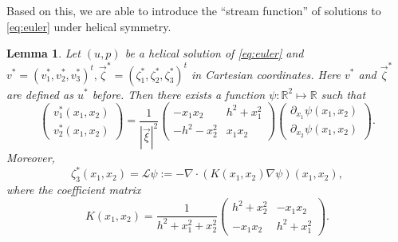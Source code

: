 \documentclass[12pt,reqno]{amsart}
\numberwithin{equation}{section}
\newtheorem{lemma}[theorem]{Lemma}
\theoremstyle{definition}
\theoremstyle{remark}
\newcommand{\Om}{\Omega}
\begin{document}
Based on this, we are able to  introduce the  ``stream function'' of   solutions to \eqref{eq:euler} under helical symmetry. %
\begin{lemma}\label{lm2-4}
Let $  (u, p)  $ be a helical solution of \eqref{eq:euler} and $ v^*=(v^*_1,v^*_2,v^*_3)^t, \vec{\zeta}^*=(\zeta_1^*,\zeta_2^*,\zeta_3^*)^t $ in Cartesian coordinates. Here $v^*$ and $\vec{\zeta}^*$ are defined as $u^*$ before. Then there exists a function  $\psi: \mathbb R^2\mapsto \mathbb R$ such that 
	   \begin{equation}\label{2-5}
	   	 \begin{pmatrix}
	   	 	v_1^*(x_1,x_2) \\
	   	 	v_2^*(x_1,x_2)
	   	 \end{pmatrix}=\frac{1}{|\vec{\xi}|^2}\begin{pmatrix}
	   	- x_1x_2 &   h^2+x_1^2  \\
	   	 -h^2-x_2^2  &  x_1x_2
   	 \end{pmatrix}  \begin{pmatrix}
   	 \partial_{x_1}\psi(x_1,x_2) \\
   	 \partial_{x_2}\psi(x_1,x_2)
    \end{pmatrix}. 
	   \end{equation}
Moreover, 
	 \begin{equation}\label{2-6}
	 	 \zeta_3^*(x_1,x_2)=\mathcal{L}\psi:=-\nabla\cdot(K(x_1,x_2)\nabla\psi)(x_1,x_2),  
	 \end{equation}
where  
the coefficient matrix
	\begin{equation*} 
		K(x_1,x_2)=\frac{1}{h^2+x_1^2+x_2^2}
		\begin{pmatrix}
			h^2+x_2^2 & -x_1x_2 \\
			-x_1x_2 &  h^2+x_1^2
		\end{pmatrix}.
	\end{equation*}
\end{lemma}
\end{document}
